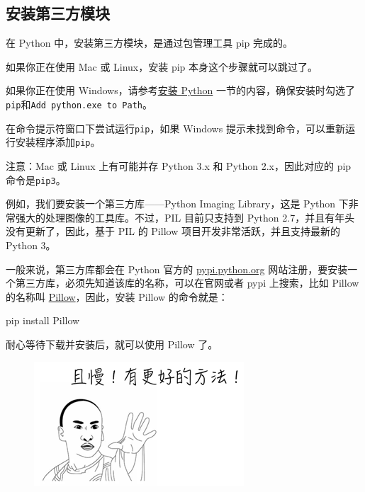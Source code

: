 \hypertarget{ux5b89ux88c5ux7b2cux4e09ux65b9ux6a21ux5757}{%
\subsection{安装第三方模块}\label{ux5b89ux88c5ux7b2cux4e09ux65b9ux6a21ux5757}}

在 Python 中，安装第三方模块，是通过包管理工具 pip 完成的。

如果你正在使用 Mac 或 Linux，安装 pip 本身这个步骤就可以跳过了。

如果你正在使用
Windows，请参考\href{https://www.liaoxuefeng.com/wiki/1016959663602400/1016959856222624}{安装
Python}
一节的内容，确保安装时勾选了\texttt{pip}和\texttt{Add\ python.exe\ to\ Path}。

在命令提示符窗口下尝试运行\texttt{pip}，如果 Windows
提示未找到命令，可以重新运行安装程序添加\texttt{pip}。

注意：Mac 或 Linux 上有可能并存 Python 3.x 和 Python 2.x，因此对应的 pip
命令是\texttt{pip3}。

例如，我们要安装一个第三方库------Python Imaging Library，这是 Python
下非常强大的处理图像的工具库。不过，PIL 目前只支持到 Python
2.7，并且有年头没有更新了，因此，基于 PIL 的 Pillow
项目开发非常活跃，并且支持最新的 Python 3。

一般来说，第三方库都会在 Python 官方的
\href{https://pypi.python.org/}{pypi.python.org}
网站注册，要安装一个第三方库，必须先知道该库的名称，可以在官网或者 pypi
上搜索，比如 Pillow 的名称叫
\href{https://pypi.python.org/pypi/Pillow/}{Pillow}，因此，安装 Pillow
的命令就是：

\begin{pythoncode}
pip install Pillow
\end{pythoncode}

耐心等待下载并安装后，就可以使用 Pillow 了。

 
 \begin{figure}[htp]
	\centering
	\includegraphics[width=0.6\linewidth]{fig/1183096336546240l.png}
\end{figure}


